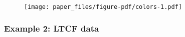 \documentclass[
]{apa7}
\begin{document}
\begin{figure}[H]

{\centering \texttt{[image: paper\_files/figure-pdf/colors-1.pdf]}

}

\end{figure}

\hypertarget{example-2-ltcf-data}{%
\subsubsection{Example 2: LTCF data}\label{example-2-ltcf-data}}
\end{document}
